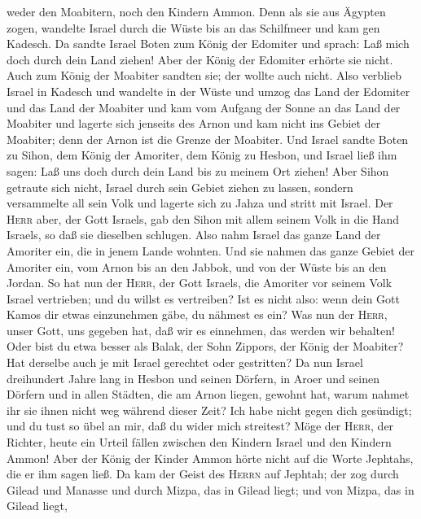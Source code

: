 weder den Moabitern, noch den Kindern Ammon.  Denn als
sie aus Ägypten zogen, wandelte Israel durch die Wüste bis an das
Schilfmeer und kam gen Kadesch.  Da sandte Israel Boten
zum König der Edomiter und sprach: Laß mich doch durch dein Land ziehen!
Aber der König der Edomiter erhörte sie nicht. Auch zum König der
Moabiter sandten sie; der wollte auch nicht.  Also
verblieb Israel in Kadesch und wandelte in der Wüste und umzog das Land
der Edomiter und das Land der Moabiter und kam vom Aufgang der Sonne an
das Land der Moabiter und lagerte sich jenseits des Arnon und kam nicht
ins Gebiet der Moabiter; denn der Arnon ist die Grenze der Moabiter.
 Und Israel sandte Boten zu Sihon, dem König der
Amoriter, dem König zu Hesbon, und Israel ließ ihm sagen: Laß uns doch
durch dein Land bis zu meinem Ort ziehen!  Aber Sihon
getraute sich nicht, Israel durch sein Gebiet ziehen zu lassen, sondern
versammelte all sein Volk und lagerte sich zu Jahza und stritt mit
Israel.  Der \textsc{Herr} aber, der Gott Israels, gab
den Sihon mit allem seinem Volk in die Hand Israels, so daß sie
dieselben schlugen. Also nahm Israel das ganze Land der Amoriter ein,
die in jenem Lande wohnten.  Und sie nahmen das ganze
Gebiet der Amoriter ein, vom Arnon bis an den Jabbok, und von der Wüste
bis an den Jordan.  So hat nun der \textsc{Herr}, der
Gott Israels, die Amoriter vor seinem Volk Israel vertrieben; und du
willst es vertreiben?  Ist es nicht also: wenn dein Gott
Kamos dir etwas einzunehmen gäbe, du nähmest es ein? Was nun der
\textsc{Herr}, unser Gott, uns gegeben hat, daß wir es einnehmen, das
werden wir behalten!  Oder bist du etwa besser als Balak,
der Sohn Zippors, der König der Moabiter? Hat derselbe auch je mit
Israel gerechtet oder gestritten?  Da nun Israel
dreihundert Jahre lang in Hesbon und seinen Dörfern, in Aroer und seinen
Dörfern und in allen Städten, die am Arnon liegen, gewohnt hat, warum
nahmet ihr sie ihnen nicht weg während dieser Zeit?  Ich
habe nicht gegen dich gesündigt; und du tust so übel an mir, daß du
wider mich streitest? Möge der \textsc{Herr}, der Richter, heute ein
Urteil fällen zwischen den Kindern Israel und den Kindern Ammon!
 Aber der König der Kinder Ammon hörte nicht auf die
Worte Jephtahs, die er ihm sagen ließ.  Da kam der Geist
des \textsc{Herrn} auf Jephtah; der zog durch Gilead und Manasse und
durch Mizpa, das in Gilead liegt; und von Mizpa, das in Gilead liegt,
